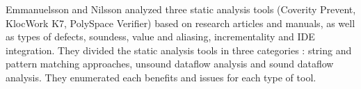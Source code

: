 Emmanuelsson and Nilsson \cite{emanuelsson2008comparative} analyzed three static analysis tools (Coverity Prevent, KlocWork K7, PolySpace Verifier) based on research articles and manuals, as well as types of defects, soundess, value and aliasing, incrementality and IDE integration. They divided the static analysis tools in three categories : string and pattern matching approaches, unsound dataflow analysis and sound dataflow analysis. They enumerated each benefits and issues for each type of tool.



%

%

